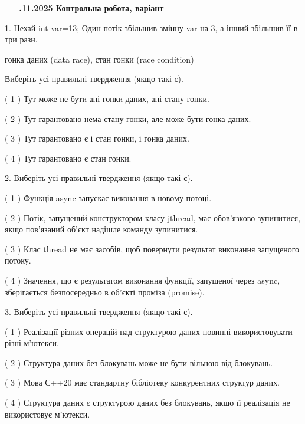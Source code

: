 \documentclass[12pt, ukrainian]{article}
\begin{document}
\newpage
\begin {large}

\textbf{\_\_.11.2025 Контрольна робота, варіант  }\par


{
1. Нехай int var=13; Один потік збільшив змінну var на 3, а інший збільшив її в три рази.

гонка даних (data race), стан гонки (race condition)

Виберіть усі правильні твердження (якщо такі є).\par
\vspace{2mm}
( 1 ) Тут може не бути ані гонки даних, ані стану гонки.%

( 2 ) Тут гарантовано нема стану гонки, але може бути гонка даних.%

( 3 ) Тут гарантовано є і стан гонки, і гонка даних.%

( 4 ) Тут гарантовано є стан гонки.%


2. Виберіть усі правильні твердження (якщо такі є).\par
\vspace{2mm}

( 1 ) Функція async запускає виконання в новому потоці.%

( 2 ) Потік, запущений конструктором класу jthread, має обов’язково зупинитися, якщо пов’язаний об’єкт надішле команду зупинитися.%

( 3 ) Клас thread не має засобів, щоб повернути результат виконання запущеного потоку.%

( 4 ) Значення, що є результатом виконання функції, запущеної через async, зберігається безпосередньо в об’єкті проміза (promise).%


3. Виберіть усі правильні твердження (якщо такі є).\par
\vspace{2mm}

( 1 ) Реалізації різних операцій над структурою даних повинні використовувати різні м’ютекси.%

( 2 ) Структура даних без блокувань може не бути вільною від блокувань.%

( 3 ) Мова С++20 має стандартну бібліотеку конкурентних структур даних.%

( 4 ) Структура даних є структурою даних без блокувань, якщо її реалізація не використовує м’ютекси.%


}
\end{large}
\end{document}
